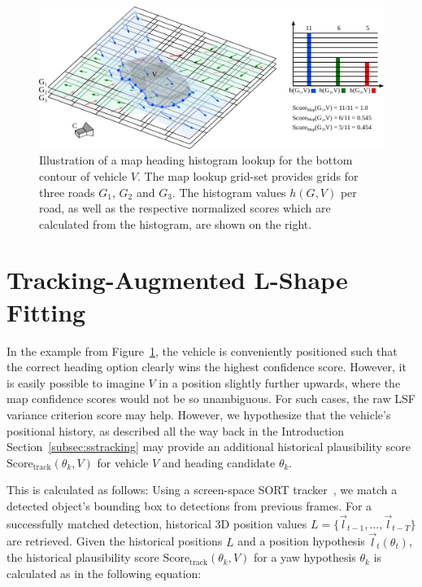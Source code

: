\begin{figure}[htb]
    \centering
    \includegraphics[width=1.0\linewidth]{figures/mapscore}
    \caption{Illustration of a map heading histogram lookup for the bottom contour of vehicle $V$. The map lookup grid-set provides grids for three roads $G_1$, $G_2$ and $G_3$. The histogram values $h(G,V)$ per road, as well as the respective normalized scores which are calculated from the histogram, are shown on the right.}
    \label{fig:mapscore}
\end{figure}



\section{Tracking-Augmented L-Shape Fitting}
\label{sec:trackinglsf}

In the example from Figure~\ref{fig:mapscore}, the vehicle is conveniently positioned such that the correct heading option clearly wins the highest confidence score.
However, it is easily possible to imagine $V$ in a position slightly further upwards, where the map confidence scores would not be so unambiguous.
For such cases, the raw LSF variance criterion score may help.
However, we hypothesize that the vehicle's positional history, as described all the way back in the Introduction Section~\ref{subsec:sstracking} may provide an additional historical plausibility score $\text{Score}_\text{track}(\theta_k, V)$ for vehicle $V$ and heading candidate $\theta_k$.

This is calculated as follows: Using a screen-space SORT tracker~\cite{bewley2016simple}, we match a detected object's bounding box to detections from previous frames.
For a successfully matched detection, historical 3D position values $L=\{\vec{l}_{t-1},\dots,\vec{l}_{t-T}\}$ are retrieved.
Given the historical positions $L$ and a position hypothesis $\vec{l}_t(\theta_t)$, the historical plausibility score $\text{Score}_\text{track}(\theta_k, V)$ for a yaw hypothesis $\theta_k$ is calculated as in the following equation:

